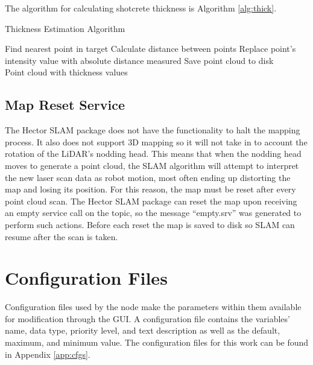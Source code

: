 The algorithm for calculating shotcrete thickness is Algorithm \ref{alg:thick}.

\begin{algorithm}[H]
\caption{Thickness Estimation Algorithm}
\label{alg:thick}
\begin{algorithmic}[1]
\begin{raggedright}
\State Find nearest point in target
\State Calculate distance between points
\State Replace point's intensity value with absolute distance measured
\EndFor
\State Save point cloud to disk
\EndFunction\\
\Return Point cloud with thickness values
\end{raggedright}
\end{algorithmic}
\end{algorithm}

\subsection{Map Reset Service}
The Hector SLAM package does not have the functionality to halt the mapping process. It also does not support 3D mapping so it will not take in to account the rotation of the LiDAR's nodding head. This means that when the nodding head moves to generate a point cloud, the SLAM algorithm will attempt to interpret the new laser scan data as robot motion, most often ending up distorting the map and losing its position. For this reason, the map must be reset after every point cloud scan. The Hector SLAM package can reset the map upon receiving an empty service call on the  topic, so the message ``empty.srv'' was generated to perform such actions. Before each reset the map is saved to disk so SLAM can resume after the scan is taken.\\

\section{Configuration Files}
Configuration files used by the  node make the parameters within them available for modification through the  GUI. A configuration file contains the variables' name, data type, priority level, and text description as well as the default, maximum, and minimum value. The configuration files for this work can be found in Appendix \ref{app:cfgs}.\\

